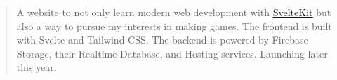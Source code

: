 \begin{cvparagraph}
\begin{quote}
\thinspace A website to not only learn modern web development with \href{https://kit.svelte.dev/}{\underline{SvelteKit}} but also a way to pursue my interests in making games. The 
frontend is built with Svelte and Tailwind CSS. The backend is powered by Firebase Storage, their Realtime Database, and Hosting services. Launching later this year. 
\end{quote}



\end{cvparagraph}
